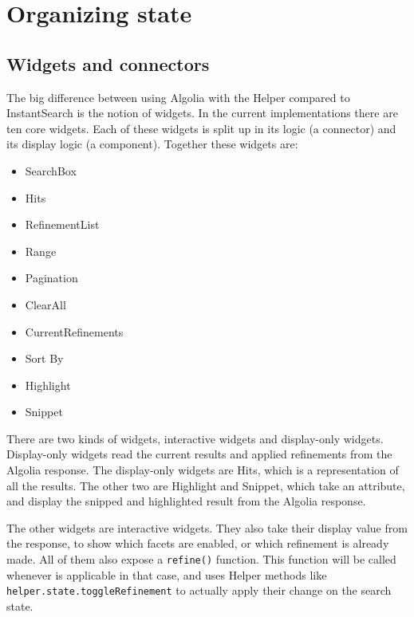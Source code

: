 
\section{Organizing state} %
\label{sec:organizing_state}

\subsection{Widgets and connectors}
\label{sub:widgets_and_connectors}

The big difference between using Algolia with the Helper compared to InstantSearch is the notion of widgets. In the current implementations there are ten core widgets. Each of these widgets is split up in its logic (a connector) and its display logic (a component). Together these widgets are:

\begin{itemize}
  \item SearchBox
  \item Hits
  \item RefinementList
  \item Range
  \item Pagination
  \item ClearAll
  \item CurrentRefinements
  \item Sort By
  \item Highlight
  \item Snippet
\end{itemize}

There are two kinds of widgets, interactive widgets and display-only widgets. Display-only widgets read the current results and applied \glspl{refinement} from the Algolia response. The display-only widgets are Hits, which is a representation of all the results. The other two are Highlight and Snippet, which take an attribute, and display the snipped and highlighted result from the Algolia response.

The other widgets are interactive widgets. They also take their display value from the response, to show which facets are enabled, or which \gls{refinement} is already made. All of them also expose a {\tt refine()} function. This function will be called whenever is applicable in that case, and uses Helper methods like {\tt helper.state.toggleRefinement} to actually apply their change on the search state.


